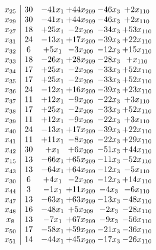\documentclass[11pt]{article}
\begin{document}
\[\begin{array}{c| c c@{\hskip 2pt} c@{\hskip 2pt} c@{\hskip 2pt} c@{\hskip 2pt} }
 x_{25}   &  30 & -41 x_{1} & + 44 x_{209} & -46 x_{3} & + 2 x_{110}\\
 x_{29}   &  30 & -41 x_{1} & + 44 x_{209} & -46 x_{3} & + 2 x_{110}\\
 x_{27}   &  18 & + 25 x_{1} & -2 x_{209} & -34 x_{3} & + 53 x_{110}\\
 x_{31}   &  24 & -13 x_{1} & + 17 x_{209} & -39 x_{3} & + 22 x_{110}\\
 x_{32}   &  6 & + 5 x_{1} & -3 x_{209} & -12 x_{3} & + 15 x_{110}\\
 x_{33}   &  18 & -26 x_{1} & + 28 x_{209} & -28 x_{3} & +  x_{110}\\
 x_{34}   &  17 & + 25 x_{1} & -2 x_{209} & -33 x_{3} & + 52 x_{110}\\
 x_{35}   &  17 & + 25 x_{1} & -2 x_{209} & -33 x_{3} & + 52 x_{110}\\
 x_{36}   &  24 & -12 x_{1} & + 16 x_{209} & -39 x_{3} & + 23 x_{110}\\
 x_{37}   &  11 & + 12 x_{1} & -9 x_{209} & -22 x_{3} & + 3 x_{110}\\
 x_{38}   &  17 & + 25 x_{1} & -2 x_{209} & -33 x_{3} & + 52 x_{110}\\
 x_{39}   &  11 & + 12 x_{1} & -9 x_{209} & -22 x_{3} & + 3 x_{110}\\
 x_{40}   &  24 & -13 x_{1} & + 17 x_{209} & -39 x_{3} & + 22 x_{110}\\
 x_{41}   &  11 & + 11 x_{1} & -8 x_{209} & -22 x_{3} & + 29 x_{110}\\
 x_{42}   &  30 & +  x_{1} & + 6 x_{209} & -51 x_{3} & + 44 x_{110}\\
 x_{15}   &  13 & -66 x_{1} & + 65 x_{209} & -11 x_{3} & -52 x_{110}\\
 x_{43}   &  13 & -64 x_{1} & + 64 x_{209} & -12 x_{3} & -5 x_{110}\\
 x_{30}   &  6 & + 4 x_{1} & -2 x_{209} & -12 x_{3} & + 14 x_{110}\\
 x_{44}   &  3 & -1 x_{1} & + 11 x_{209} & -4 x_{3} & -6 x_{110}\\
 x_{47}   &  13 & -63 x_{1} & + 63 x_{209} & -13 x_{3} & -48 x_{110}\\
 x_{48}   &  16 & -48 x_{1} & + 5 x_{209} & -2 x_{3} & -28 x_{110}\\
 x_{8}   &  13 & -7 x_{1} & + 67 x_{209} & -9 x_{3} & -56 x_{110}\\
 x_{50}   &  17 & -58 x_{1} & + 59 x_{209} & -21 x_{3} & -36 x_{110}\\
 x_{51}   &  14 & -44 x_{1} & + 45 x_{209} & -17 x_{3} & -26 x_{110}\\

\end{array}\]
\end{document}
